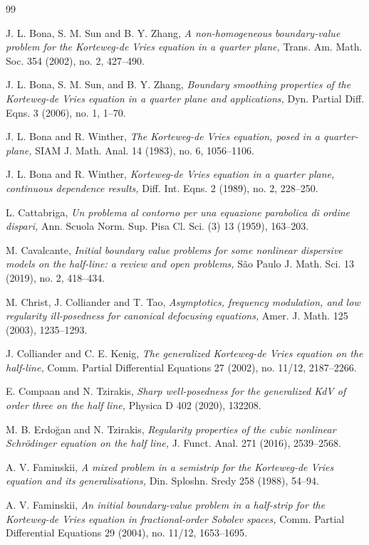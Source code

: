 \documentclass[10pt,reqno]{amsart}
\theoremstyle{remark}
\numberwithin{equation}{section}
\begin{document}
\begin{thebibliography}{99}

 J. L. Bona, S. M. Sun and B. Y. Zhang, {\it A non-homogeneous boundary-value problem for the Korteweg-de Vries equation in a quarter plane,} Trans. Am. Math. Soc. 354 (2002), no. 2, 427--490.

 J. L. Bona, S. M. Sun, and B. Y. Zhang, {\it Boundary smoothing properties of the Korteweg-de Vries equation in a quarter plane and applications,} Dyn. Partial Diff. Eqns. 3 (2006), no. 1, 1--70.

 J. L. Bona and R. Winther, {\it The Korteweg-de Vries equation, posed in a quarter-plane,} SIAM J. Math. Anal. 14 (1983), no. 6, 1056--1106.

 J. L. Bona and R. Winther, {\it Korteweg-de Vries equation in a quarter plane, continuous dependence results,} Diff. Int. Eqns. 2 (1989), no. 2, 228--250.

 L. Cattabriga, {\it Un problema al contorno per una equazione parabolica di ordine dispari,} Ann. Scuola Norm. Sup. Pisa Cl. Sci. (3) 13 (1959), 163--203.

 M. Cavalcante, {\it Initial boundary value problems for some nonlinear dispersive models on the half-line: a review and open problems,} S\~ao Paulo J. Math. Sci. 13 (2019), no. 2, 418--434.

 M. Christ, J. Colliander and T. Tao, {\it Asymptotics, frequency modulation, and low regularity ill-posedness for canonical defocusing equations,} Amer. J. Math. 125 (2003), 1235--1293.

 J. Colliander and C. E. Kenig, {\it The generalized Korteweg-de Vries equation on the half-line,} Comm. Partial Differential Equations 27 (2002), no. 11/12, 2187--2266.

 E. Compaan and N. Tzirakis, {\it Sharp well-posedness for the generalized KdV of order three on the half line,} Physica D 402 (2020), 132208.

 M. B. Erdo\u{g}an and N. Tzirakis, {\it Regularity properties of the cubic nonlinear Schr\"odinger equation on the half line,} J. Funct. Anal. 271 (2016), 2539--2568.

 A. V. Faminskii, {\it A mixed problem in a semistrip for the Korteweg-de Vries equation and its generalisations,} Din. Sploshn. Sredy 258 (1988), 54--94.

 A. V. Faminskii, {\it An initial boundary-value problem in a half-strip for the Korteweg-de Vries equation in fractional-order Sobolev spaces,} Comm. Partial Differential Equations 29 (2004), no. 11/12, 1653--1695.


\end{thebibliography}
\end{document}
